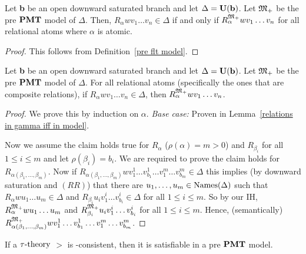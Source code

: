  \begin{lemma} \label{relations in gamma iff in model}
        Let \textbf{b} be an open downward saturated branch and let $\Delta=\textbf{U}(\textbf{b})$. Let ${\mathfrak{M}_+}$ be the pre $\textbf{PMT}$ model of $\Delta$. Then, $R_\alpha wv_1\ldots v_n \in \Delta$ if and only if $ R_\alpha^{{\mathfrak{M}_+}}wv_1\ldots v_n$ for all relational atoms where $\alpha$ is atomic.
    \end{lemma}
    \begin{proof}
        This follows from Definition~\ref{pre flt model}. 
    \end{proof}

 \begin{lemma} \label{relations in gamma are in model}
        Let \textbf{b} be an open downward saturated branch and let $\Delta=\textbf{U}(\textbf{b})$. Let ${\mathfrak{M}_+}$ be the pre $\textbf{PMT}$ model of $\Delta$. For all relational atoms (specifically the ones that are composite relations), if $R_\alpha wv_1\ldots v_n\in \Delta$, then $ R_\alpha^{{\mathfrak{M}_+}}wv_1\ldots v_n$.
    \end{lemma}

\begin{proof}
        We prove this by induction on $\alpha$. \textit{Base case:} Proven in Lemma~\ref{relations in gamma iff in model}.
        \par Now we assume the claim holds true for $R_\alpha$ ($\rho(\alpha)=m>0$) and $R_{\beta_i}$ for all $1\leq i\leq m$ and let $\rho(\beta_i) =b_i$. We are required to prove the claim holds for $R_{\alpha(\beta_1,\ldots,\beta_m)}$. Now if $R_{\alpha(\beta_1,\ldots,\beta_m)}wv_1^1\ldots v_{b_1}^1 \ldots v_1^m\ldots v_{b_m}^m\in\Delta$ this implies (by downward saturation and $(RR)$) that there are $u_1,\ldots, u_m\in\text{Names}(\Delta)$ such that $R_\alpha wu_1\ldots u_m\in\Delta$ and $R_{\beta_i}u_iv_1^i\ldots v_{b_i}^i\in\Delta$ for all $1\leq i\leq m$. So by our IH, $R^{{\mathfrak{M}_+}}_\alpha wu_1\ldots u_m$ and $R^{{\mathfrak{M}_+}}_{\beta_i}u_iv_1^i\ldots v_{b_i}^i$ for all $1\leq i\leq m$. Hence, (semantically) $R^{{\mathfrak{M}_+}}_{\alpha(\beta_1,\ldots,\beta_m)}wv_1^1\ldots v_{b_1}^1 \ldots v_1^m\ldots v_{b_m}^m$.
    \end{proof}

\begin{theorem}\label{completeness of flt theorem}
    If a $\tau\text{-theory}$ $\gt$ is \pmt-consistent, then it is satisfiable in a pre $\textbf{PMT}$ model.
\end{theorem}


